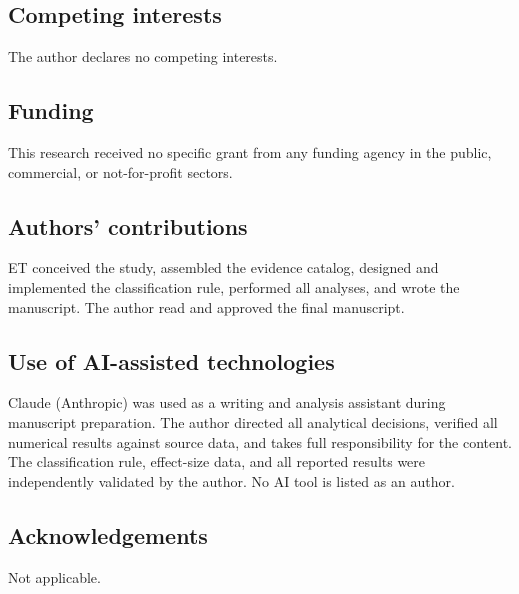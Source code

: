 \documentclass[11pt]{article}
\begin{document}
\subsection*{Competing interests}
The author declares no competing interests.

\subsection*{Funding}
This research received no specific grant from any funding agency in the public, commercial, or not-for-profit sectors.

\subsection*{Authors' contributions}
ET conceived the study, assembled the evidence catalog, designed and implemented the classification rule, performed all analyses, and wrote the manuscript. The author read and approved the final manuscript.

\subsection*{Use of AI-assisted technologies}
Claude (Anthropic) was used as a writing and analysis assistant during manuscript preparation. The author directed all analytical decisions, verified all numerical results against source data, and takes full responsibility for the content. The classification rule, effect-size data, and all reported results were independently validated by the author. No AI tool is listed as an author.

\subsection*{Acknowledgements}
Not applicable.



\end{document}
